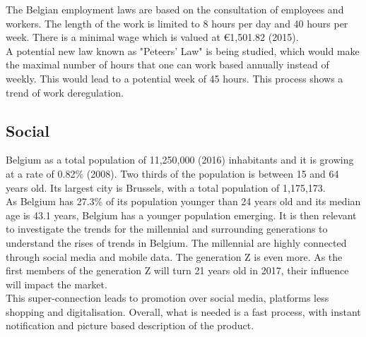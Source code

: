 \documentclass[12pt,a4paper,oneside]{book}
\begin{document}

The Belgian employment laws are based on the consultation of employees and workers. The length of the work is limited to 8 hours per day and 40 hours per week. There is a minimal wage which is valued at \euro 1,501.82 (2015).\cite{eurostatmw}\\

A potential new law known as "Peteers' Law" is being studied, which would make the maximal number of hours that one can work based annually instead of weekly. This would lead to a potential week of 45 hours. This process shows a trend of work deregulation.\\


\subsection{Social}

Belgium as a total population of 11,250,000 (2016) inhabitants and it is growing at a rate of 0.82\% (2008). Two thirds of the population is between 15 and 64 years old. Its largest city is Brussels, with a total population of 1,175,173.\cite{ciafb}\\


As Belgium has 27.3\% of its population younger than 24 years old and its median age is 43.1 years, Belgium has a younger population emerging\cite{ciafb}. It is then relevant to investigate the trends for the millennial and surrounding generations to understand the rises of trends in Belgium. The millennial are highly connected through social media and mobile data. The generation Z is even more. As the first members of the generation Z will turn 21 years old in 2017, their influence will impact the market.\\
This super-connection leads to promotion over social media, platforms less shopping and digitalisation. Overall, what is needed is a fast process, with instant notification and picture based description of the product.\cite{stbe}
\end{document}
